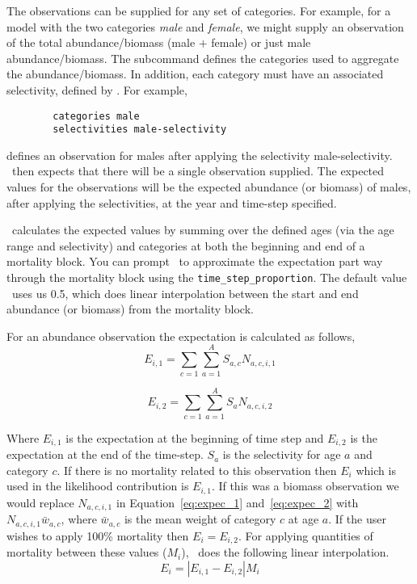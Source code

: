The observations can be supplied for any set of categories. For example, for a model with the two categories \emph{male} and \emph{female}, we might supply an observation of the total abundance/biomass (male $+$ female) or just male abundance/biomass. The subcommand  defines the categories used to aggregate the abundance/biomass. In addition, each category must have an associated selectivity, defined by . For example,  

{\small{\begin{verbatim}
		categories male
		selectivities male-selectivity
		\end{verbatim}}}

defines an observation for males after applying the selectivity male-selectivity. \CNAME\ then expects that there will be a single observation supplied. The expected values for the observations will be the expected abundance (or biomass) of males, after applying the selectivities, at the year and time-step specified. 

\CNAME\ calculates the expected values by summing over the defined ages (via the age range and selectivity) and categories at both the beginning and end of a mortality block. You can prompt \CNAME\ to approximate the expectation part way through the mortality block using the \texttt{time\_step\_proportion}. The default value \CNAME\ uses us 0.5, which does linear interpolation between the start and end abundance (or biomass) from the mortality block.

For an abundance observation the expectation is calculated as follows,
\begin{equation}\label{eq:expec_1}
E_{i,1} = \sum_{c=1}^{} \sum_{a=1}^{A} S_{a,c} N_{a,c,i,1}
\end{equation}

\begin{equation}\label{eq:expec_2}
E_{i,2} = \sum_{c=1}^{} \sum_{a=1}^{A} S_a N_{a,c,i,2}
\end{equation}

Where $E_{i,1}$ is the expectation at the beginning of time step and $E_{i,2}$ is the expectation at the end of the time-step. $S_a$ is the selectivity for age $a$ and category $c$. If there is no mortality related to this observation then $E_i$ which is used in the likelihood contribution is $E_{i,1}$. If this was a biomass observation we would replace $N_{a,c,i,1}$ in Equation~\eqref{eq:expec_1} and~\eqref{eq:expec_2} with $N_{a,c,i,1} \bar{w}_{a,c}$, where $\bar{w}_{a,c}$ is the mean weight of category $c$ at age $a$. If the user wishes to apply 100\% mortality then $E_i = E_{i,2}$. For applying quantities of mortality between these values ($M_i$), \CNAME\ does the following linear interpolation.
\begin{equation}
E_{i} = |E_{i,1} - E_{i,2}|  M_i
\end{equation}



